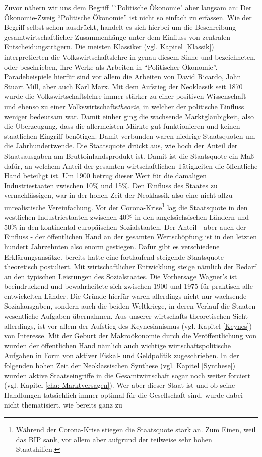 Zuvor nähern wir uns dem Begriff "`Politische Ökonomie" aber langsam an: Der Ökonomie-Zweig "`Politische Ökonomie"' ist nicht so einfach zu erfassen. Wie der Begriff selbst schon ausdrückt, handelt es sich hierbei um die Beschreibung gesamtwirtschaftlicher Zusammenhänge unter dem Einfluss von zentralen Entscheidungsträgern. Die meisten Klassiker (vgl. Kapitel \ref{Klassik}) interpretierten die Volkswirtschaftslehre in genau diesem Sinne und bezeichneten, oder beschrieben, ihre Werke als Arbeiten in "`Politischer Ökonomie"'. Paradebeispiele hierfür sind vor allem die Arbeiten von David Ricardo, John Stuart Mill, aber auch Karl Marx. Mit dem Aufstieg der Neoklassik seit 1870 wurde die Volkswirtschaftslehre immer stärker zu einer positiven Wissenschaft und ebenso zu einer Volkswirtschafts\textit{theorie}, in welcher der politische Einfluss weniger bedeutsam war. Damit einher ging die wachsende Marktgläubigkeit, also die Überzeugung, dass die allermeisten Märkte gut funktionieren und keinen staatlichen Eingriff benötigen. Damit verbunden waren niedrige Staatsquoten um die Jahrhundertwende. Die Staatsquote drückt aus, wie hoch der Anteil der Staatsausgaben am Bruttoinlandsprodukt ist. Damit ist die Staatsquote ein Maß dafür, an welchem Anteil der gesamten wirtschaftlichen Tätigkeiten die öffentliche Hand beteiligt ist. Um 1900 betrug dieser Wert für die damaligen Industriestaaten zwischen 10\% und 15\%. Den Einfluss des Staates zu vernachlässigen, war in der hohen Zeit der Neoklassik also eine nicht allzu unrealistische Vereinfachung. Vor der Corona-Krise\footnote{Während der Corona-Krise stiegen die Staatsquote stark an. Zum Einen, weil das BIP sank, vor allem aber aufgrund der teilweise sehr hohen Staatshilfen.} lag die Staatsquote in den westlichen Industriestaaten zwischen 40\% in den angelsächsischen Ländern und 50\% in den kontinental-europäischen Sozialstaaten. Der Anteil - aber auch der Einfluss - der öffentlichen Hand an der gesamten Wertschöpfung ist in den letzten hundert Jahrzehnten also enorm gestiegen. Dafür gibt es verschiedene Erklärungsansätze. \textcite{Wagner1892} bereits hatte eine fortlaufend steigende Staatsquote theoretisch postuliert. Mit wirtschaftlicher Entwicklung steige nämlich der Bedarf an den typischen Leistungen des Sozialstaates. Die Vorhersage Wagner's ist beeindruckend und bewahrheitete sich zwischen 1900 und 1975 für praktisch alle entwickelten Länder. Die Gründe hierfür waren allerdings nicht nur wachsende Sozialausgaben, sondern auch die beiden Weltkriege, in deren Verlauf die Staaten wesentliche Aufgaben übernahmen. Aus unserer wirtschafts-theoretischen Sicht allerdings, ist vor allem der Aufstieg des Keynesianismus (vgl. Kapitel \ref{Keynes}) von Interesse. Mit der Geburt der Makroökonomie durch die Veröffentlichung von \textcite{Keynes1936} wurden der öffentlichen Hand nämlich auch wichtige wirtschaftspolitische Aufgaben in Form von aktiver Fiskal- und Geldpolitik zugeschrieben. In der folgenden hohen Zeit der Neoklassischen Synthese (vgl. Kapitel \ref{Synthese}) wurden aktive Staatseingriffe in die Gesamtwirtschaft sogar noch weiter forciert (vgl. Kapitel \ref{cha: Marktversagen}). Wer aber dieser Staat ist und ob seine Handlungen tatsächlich immer optimal für die Gesellschaft sind, wurde dabei nicht thematisiert, wie bereits ganz zu 